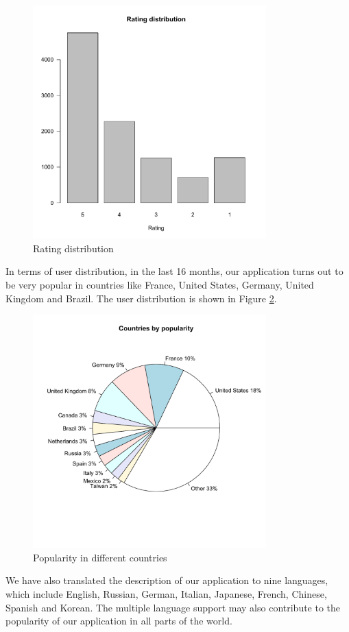 \begin{figure}[!t]
\centering \includegraphics[height=9cm]{charts/rating_distribution}
\caption{Rating distribution\label{ratings}}
\end{figure}
In terms of user distribution, in the last 16 months, our application turns out
to be very popular in countries like France, United States, Germany, United Kingdom
and Brazil. The user distribution is shown in Figure \ref{user_country}.
\begin{figure}[hb]
\centering \includegraphics[height=9cm]{charts/country_popularity}
\caption{Popularity in different countries \label{user_country}}
\end{figure}
We have also translated the description of our application to nine languages, which include English, Russian, German, Italian, Japanese, French, Chinese, Spanish and Korean. The multiple language support may also contribute to the popularity of our application in all parts of the world.
